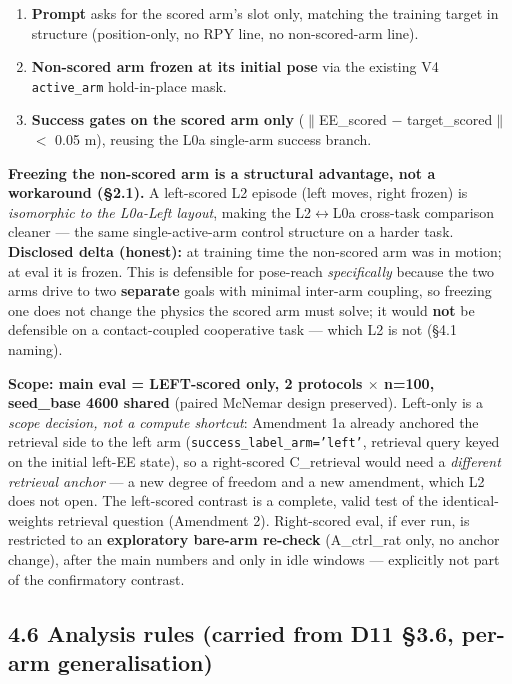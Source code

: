 \begin{enumerate}
\item \textbf{Prompt} asks for the scored arm's slot only, matching the training
   target in structure (position-only, no RPY line, no non-scored-arm
   line).
\item \textbf{Non-scored arm frozen at its initial pose} via the existing V4
   \texttt{active\_arm} hold-in-place mask.
\item \textbf{Success gates on the scored arm only} ($\|$EE\_scored $-$ target\_scored$\|$
   $<$ 0.05 m), reusing the L0a single-arm success branch.
\end{enumerate}

\textbf{Freezing the non-scored arm is a structural advantage, not a
workaround (\S2.1).} A left-scored L2 episode (left moves, right frozen)
is \emph{isomorphic to the L0a-Left layout}, making the L2$\leftrightarrow$L0a cross-task
comparison cleaner --- the same single-active-arm control structure on a
harder task. \textbf{Disclosed delta (honest):} at training time the
non-scored arm was in motion; at eval it is frozen. This is defensible
for pose-reach \emph{specifically} because the two arms drive to two
\textbf{separate} goals with minimal inter-arm coupling, so freezing one does
not change the physics the scored arm must solve; it would \textbf{not} be
defensible on a contact-coupled cooperative task --- which L2 is not (\S4.1
naming).

\textbf{Scope: main eval = LEFT-scored only, 2 protocols $\times$ n=100, seed\_base
4600 shared} (paired McNemar design preserved). Left-only is a \emph{scope
decision, not a compute shortcut}: Amendment 1a already anchored the
retrieval side to the left arm (\texttt{success\_label\_arm='left'}, retrieval
query keyed on the initial left-EE state), so a right-scored C\_retrieval
would need a \emph{different retrieval anchor} --- a new degree of freedom and a
new amendment, which L2 does not open. The left-scored contrast is a
complete, valid test of the identical-weights retrieval question
(Amendment 2). Right-scored eval, if ever run, is restricted to an
\textbf{exploratory bare-arm re-check} (A\_ctrl\_rat only, no anchor change),
after the main numbers and only in idle windows --- explicitly not part of
the confirmatory contrast.

\subsection*{4.6 Analysis rules (carried from D11 \S3.6, per-arm generalisation)}

